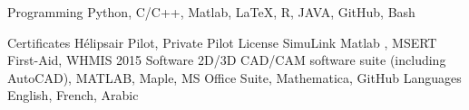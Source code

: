 

\begin{cvskills}

  \cvskill
    {Programming} %
    {Python, C/C++, Matlab, LaTeX, R, JAVA, GitHub, Bash} %

  \cvskill
    {Certificates} %
    {Hélipsair Pilot, Private Pilot License SimuLink Matlab , MSERT First-Aid, WHMIS 2015} %
\cvskill
    {Software} %
    {2D/3D CAD/CAM software suite (including AutoCAD), MATLAB, Maple, MS Office Suite, Mathematica, GitHub} %
  \cvskill
    {Languages} %
    {English, French, Arabic} %

\end{cvskills}
